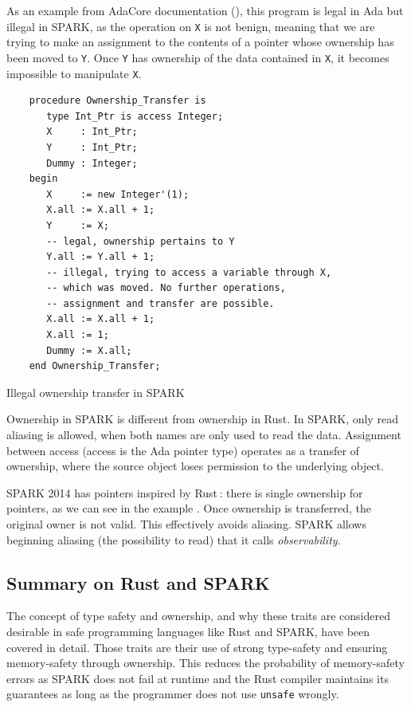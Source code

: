 \documentclass[nomenclature, english, bibtex]{kththesis}
\begin{document}
As an example from AdaCore documentation (), this program is legal in Ada but illegal in SPARK, as the operation on \texttt{X} is not benign, meaning that we are trying to make an assignment to the contents of a pointer whose \gls{ownership} has been moved to \texttt{Y}. Once \texttt{Y} has ownership of the data contained in \texttt{X}, it becomes impossible to manipulate \texttt{X}.

\begin{listing}[!ht]
    \begin{verbatim}
    procedure Ownership_Transfer is
       type Int_Ptr is access Integer;
       X     : Int_Ptr;
       Y     : Int_Ptr;
       Dummy : Integer;
    begin
       X     := new Integer'(1);
       X.all := X.all + 1;
       Y     := X;
       -- legal, ownership pertains to Y
       Y.all := Y.all + 1;  
       -- illegal, trying to access a variable through X,
       -- which was moved. No further operations, 
       -- assignment and transfer are possible.
       X.all := X.all + 1;  
       X.all := 1;          
       Dummy := X.all;      
    end Ownership_Transfer;
    \end{verbatim}
    \caption[Illegal ownership transfer in SPARK]{Illegal ownership transfer in SPARK}
    \label{lstlisting:spark_illegal_transfer}
\end{listing}


Ownership in SPARK is different from ownership in Rust. In SPARK, only read aliasing is allowed, when both names are only used to read the data. Assignment between access (access is the Ada pointer type) operates as a transfer of ownership, where the source object loses permission to the underlying object.

SPARK 2014 has pointers inspired by Rust\,\cite{dross_using_2019}: there is single ownership for pointers, as we can see in the example . Once ownership is transferred, the original owner is not valid. This effectively avoids aliasing.
SPARK allows beginning aliasing (the possibility to read) that it calls \textit{observability}.

\subsection{Summary on Rust and SPARK}

The concept of type safety and ownership, and why these traits are considered desirable in safe programming languages like Rust and SPARK, have been covered in detail. Those traits are their use of strong \gls{type-safety} and ensuring \gls{memory-safety} through \gls{ownership}. This reduces the probability of \gls{memory-safety} errors as SPARK does not fail at runtime and the Rust compiler maintains its guarantees as long as the programmer does not use \texttt{unsafe} wrongly.
\end{document}
